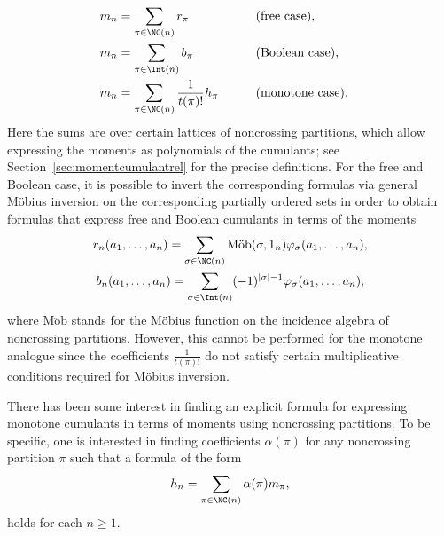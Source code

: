 \begin{alignat*}{3}
& m_n = \sum_{\pi\in \NC(n)} r_\pi \qquad && \text{(free case)},& \\
& m_n = \sum_{\pi\in \Int(n)} b_\pi \qquad && \text{(Boolean case)}, &\\
& m_n = \sum_{\pi\in \NC(n)} \frac{1}{t(\pi)! }h_\pi \qquad && \text{(monotone case)}.&
\end{alignat*}
Here the sums are over certain lattices of noncrossing partitions, which allow expressing the moments as polynomials of the cumulants; see Section~\ref{sec:momentcumulantrel} for the precise definitions. For the free and Boolean case, it is possible to invert the corresponding formulas via general M\"obius inversion on the corresponding partially ordered sets in order to obtain formulas that express free and Boolean cumulants in terms of the moments
\begin{gather}
	\label{eq:freeCM}
	r_n(a_1,\dots,a_n)
	= \sum_{\sigma \in \NC(n)} \operatorname{M\ddot{o}b}(\sigma,1_n)\varphi_\sigma(a_1,\dots,a_n),
	\\ \label{eq:BoolCM}
	b_n(a_1,\dots,a_n)
	= \sum_{\sigma \in \Int(n)}(-1)^{|\sigma|-1}\varphi_\sigma(a_1,\dots,a_n),
\end{gather}
where $\mathrm{M\ddot{o}b}$ stands for the M\"obius function on the incidence algebra of noncrossing partitions. However, this cannot be performed for the monotone analogue since the coefficients $\frac{1}{t(\pi)!}$ do not satisfy certain multiplicative conditions required for M\"obius inversion.

There has been some interest in finding an explicit formula for expressing monotone cumulants in terms of moments using noncrossing partitions. To be specific, one is interested in finding coefficients $\alpha(\pi)$ for any noncrossing partition $\pi$ such that a formula of the form
\begin{equation}\label{eq:objective}
h_n = \sum_{\pi\in \NC(n)} \alpha(\pi)m_\pi,
\end{equation}
holds for each $n\geq 1$.

